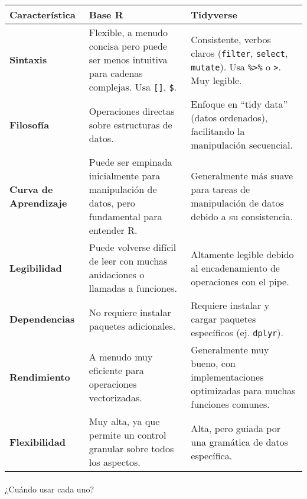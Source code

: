 \documentclass[
  letterpaper,
  DIV=11,
  numbers=noendperiod]{scrartcl}
\makeatletter
\let\oldparagraph\paragraph
\renewcommand{\paragraph}{
    \@ifstar
      \xxxParagraphStar
      \xxxParagraphNoStar
  }
\newcommand{\xxxParagraphStar}[1]{\oldparagraph*{#1}\mbox{}}
\newcommand{\xxxParagraphNoStar}[1]{\oldparagraph{#1}\mbox{}}
\makeatother
\begin{document}
\begin{longtable}[]{@{}
  >{\raggedright\arraybackslash}p{}
  >{\raggedright\arraybackslash}p{}
  >{\raggedright\arraybackslash}p{}@{}}
\toprule\noalign{}
\begin{minipage}[b]{\linewidth}\raggedright
Característica
\end{minipage} & \begin{minipage}[b]{\linewidth}\raggedright
Base R
\end{minipage} & \begin{minipage}[b]{\linewidth}\raggedright
Tidyverse
\end{minipage} \\
\midrule\noalign{}
\endhead
\bottomrule\noalign{}
\endlastfoot
\textbf{Sintaxis} & Flexible, a menudo concisa pero puede ser menos
intuitiva para cadenas complejas. Usa \texttt{{[}{]}}, \texttt{\$}. &
Consistente, verbos claros (\texttt{filter}, \texttt{select},
\texttt{mutate}). Usa \texttt{\%\textgreater{}\%} o
\texttt{\textbar{}\textgreater{}}. Muy legible. \\
\textbf{Filosofía} & Operaciones directas sobre estructuras de datos. &
Enfoque en ``tidy data'' (datos ordenados), facilitando la manipulación
secuencial. \\
\textbf{Curva de Aprendizaje} & Puede ser empinada inicialmente para
manipulación de datos, pero fundamental para entender R. & Generalmente
más suave para tareas de manipulación de datos debido a su
consistencia. \\
\textbf{Legibilidad} & Puede volverse difícil de leer con muchas
anidaciones o llamadas a funciones. & Altamente legible debido al
encadenamiento de operaciones con el pipe. \\
\textbf{Dependencias} & No requiere instalar paquetes adicionales. &
Requiere instalar y cargar paquetes específicos (ej. \texttt{dplyr}). \\
\textbf{Rendimiento} & A menudo muy eficiente para operaciones
vectorizadas. & Generalmente muy bueno, con implementaciones optimizadas
para muchas funciones comunes. \\
\textbf{Flexibilidad} & Muy alta, ya que permite un control granular
sobre todos los aspectos. & Alta, pero guiada por una gramática de datos
específica. \\
\end{longtable}

\paragraph{¿Cuándo usar cada uno?}\label{cuuxe1ndo-usar-cada-uno}
\end{document}
